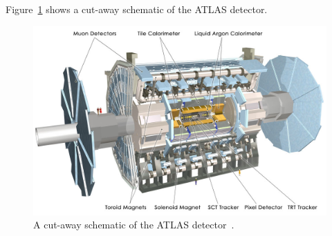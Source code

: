 Figure~\ref{fig:det-ATLAS_schem} shows a cut-away schematic of the ATLAS detector.

\begin{figure}[!htb]
  \begin{center}
    \includegraphics[width=0.9\linewidth, angle=0]{figs/Detector/ATLAS_schem.jpg}
  \end{center}
  \vspace{-1em}
  \caption[A cut-away schematic of the ATLAS detector.]{ A cut-away schematic of the ATLAS detector~\cite{det-ATLAS_Exp}.}
  \label{fig:det-ATLAS_schem}
\end{figure}




